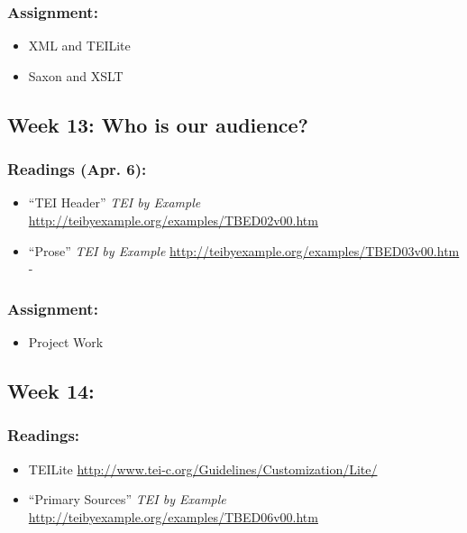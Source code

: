 \documentclass[]{article}
\begin{document}
\subsubsection{Assignment:}\label{assignment-5}

\begin{itemize}
\itemsep1pt\parskip0pt
\item
  XML and TEILite
\item
  Saxon and XSLT
\end{itemize}

\subsection{Week 13: Who is our
audience?}\label{week-13-who-is-our-audience}

\subsubsection{Readings (Apr. 6):}\label{readings-apr.-6}

\begin{itemize}
\itemsep1pt\parskip0pt
\item
  ``TEI Header'' \emph{TEI by Example}
  \url{http://teibyexample.org/examples/TBED02v00.htm}
\item
  ``Prose'' \emph{TEI by Example}
  \url{http://teibyexample.org/examples/TBED03v00.htm} -
\end{itemize}

\subsubsection{Assignment:}\label{assignment-6}

\begin{itemize}
\itemsep1pt\parskip0pt
\item
  Project Work
\end{itemize}

\subsection{Week 14:}\label{week-14}

\subsubsection{Readings:}\label{readings}

\begin{itemize}
\itemsep1pt\parskip0pt
\item
  TEILite \url{http://www.tei-c.org/Guidelines/Customization/Lite/}
\item
  ``Primary Sources'' \emph{TEI by Example}
  \url{http://teibyexample.org/examples/TBED06v00.htm}
\end{itemize}
\end{document}
